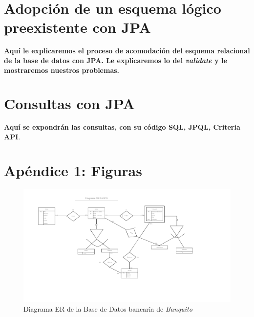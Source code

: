 \documentclass[11pt,a4paper]{article}
\begin{document}
\section{Adopción de un esquema lógico preexistente con JPA}

\textbf{Aquí le explicaremos el proceso de acomodación del esquema relacional de la base de datos con JPA. Le explicaremos lo del \emph{validate} y le mostraremos nuestros problemas.}

\section{Consultas con JPA}

\textbf{Aquí se expondrán las consultas, con su código SQL, JPQL, Criteria API}.

\section{Apéndice 1: Figuras}

\begin{landscape}
\begin{figure}
\includegraphics[scale=0.75]{images/diagramaer.png}
\caption{Diagrama ER de la Base de Datos bancaria de \emph{Banquito}}
\label{fig:diagramaer}
\end{figure}
\end{landscape}
\end{document}
